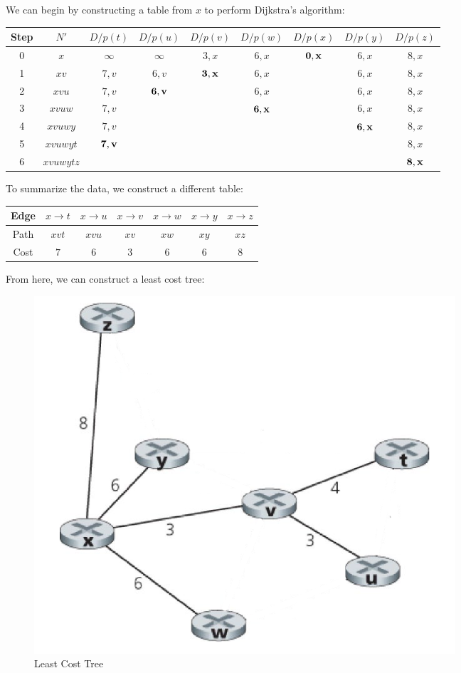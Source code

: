 \begin{enumerate}
    We can begin by constructing a table from $x$ to perform Dijkstra's algorithm:

    \begin{center}
      \begin{tabular}[h]{|c|c|c|c|c|c|c|c|c|}
        \hline
        Step & $N'$ & $D/p(t)$ & $D/p(u)$ & $D/p(v)$ & $D/p(w)$ & $D/p(x)$ & $D/p(y)$ & $D/p(z)$\\
        \hline
        0 & $x$ & $\infty$ & $\infty$ & $3,x$ & $6,x$ & $\bold{0,x}$ & $6,x$ & $8,x$\\
        \hline
        1 & $xv$ & $7,v$ & $6,v$ & $\bold{3,x}$ & $6,x$ & & $6,x$ & $8,x$\\
        \hline
        2 & $xvu$ & $7,v$ & $\bold{6,v}$ & & $6,x$ & & $6,x$ & $8,x$\\
        \hline
        3 & $xvuw$ & $7,v$ & & & $\bold{6,x}$ & & $6,x$ & $8,x$\\
        \hline
        4 & $xvuwy$ & $7,v$ & & & & & $\bold{6,x}$ & $8,x$\\
        \hline
        5 & $xvuwyt$ & $\bold{7,v}$ & & & & & & $8,x$\\
        \hline
        6 & $xvuwytz$ & & & & & & & $\bold{8,x}$\\
        \hline
      \end{tabular}
    \end{center}

    To summarize the data, we construct a different table:

    \begin{center}
      \begin{tabular}[h]{|c|c|c|c|c|c|c|}
        \hline
        Edge & $x\to t$ & $x\to u$ & $x\to v$ & $x\to w$ & $x\to y$ & $x\to z$ \\
        \hline
        Path & $xvt$ & $xvu$ & $xv$ & $xw$ & $xy$ & $xz$\\
        \hline
        Cost & $7$ & $6$ & $3$ & $6$ & $6$ & $8$\\
        \hline
      \end{tabular}
    \end{center}

    From here, we can construct a least cost tree:

    \begin{figure}[H]
      \centering
      \includegraphics[width=.6\textwidth]{Figures/LeastTree.png}
      \caption{Least Cost Tree}
      \label{fig:2}
    \end{figure}


\end{enumerate}
